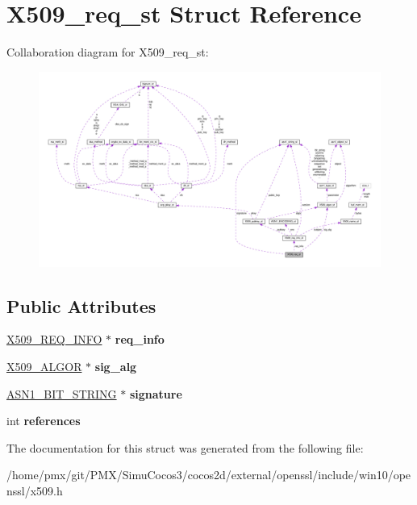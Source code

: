 \hypertarget{structX509__req__st}{}\section{X509\+\_\+req\+\_\+st Struct Reference}
\label{structX509__req__st}


Collaboration diagram for X509\+\_\+req\+\_\+st\+:
\nopagebreak
\begin{figure}[H]
\begin{center}
\leavevmode
\includegraphics[width=350pt]{structX509__req__st__coll__graph}
\end{center}
\end{figure}
\subsection*{Public Attributes}
\begin{DoxyCompactItemize}
\item 
\mbox{\label{structX509__req__st_acabf08f567bc1a05244378f6b9ce4ce0}} 
\hyperlink{structX509__req__info__st}{X509\+\_\+\+R\+E\+Q\+\_\+\+I\+N\+FO} $\ast$ {\bfseries req\+\_\+info}
\item 
\mbox{\label{structX509__req__st_aece99c32f3a4dfaae643110bf2f8a8f6}} 
\hyperlink{structX509__algor__st}{X509\+\_\+\+A\+L\+G\+OR} $\ast$ {\bfseries sig\+\_\+alg}
\item 
\mbox{\label{structX509__req__st_a43ddd2fab56363b07b095e6f1a6d43d1}} 
\hyperlink{structasn1__string__st}{A\+S\+N1\+\_\+\+B\+I\+T\+\_\+\+S\+T\+R\+I\+NG} $\ast$ {\bfseries signature}
\item 
\mbox{\label{structX509__req__st_a4c2c07b36957fd3bb1ec804265a0184d}} 
int {\bfseries references}
\end{DoxyCompactItemize}


The documentation for this struct was generated from the following file\+:\begin{DoxyCompactItemize}
\item 
/home/pmx/git/\+P\+M\+X/\+Simu\+Cocos3/cocos2d/external/openssl/include/win10/openssl/x509.\+h\end{DoxyCompactItemize}
